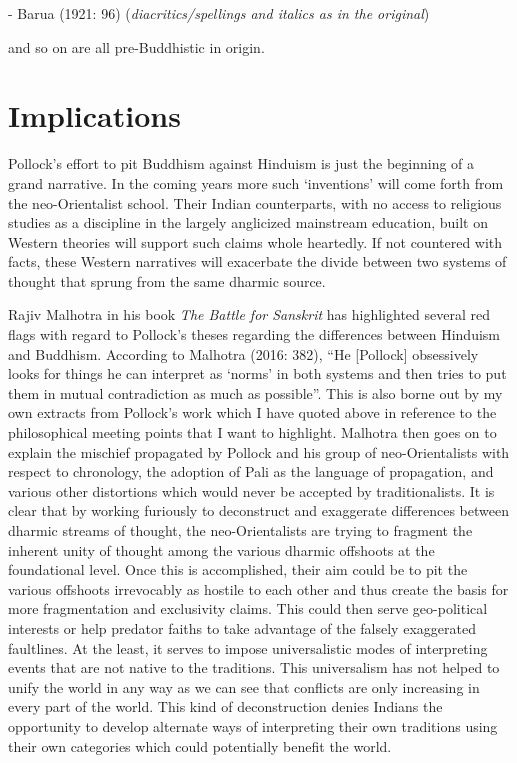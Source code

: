 {\vspace{-.3cm}

\begin{flushright}
- Barua (1921: 96) (\textit{diacritics/spellings and italics as in the original})
\end{flushright}} and so on are all pre-Buddhistic in origin.

\vspace{-.3cm}

\section*{Implications}

Pollock’s effort to pit Buddhism against Hinduism is just the beginning of a grand narrative. In the coming years more such ‘inventions’ will come forth from the neo-Orientalist school. Their Indian counterparts, with no access to religious studies as a discipline in the largely anglicized mainstream education, built on Western theories will support such claims whole heartedly. If not countered with facts, these Western narratives will exacerbate the divide between two systems of thought that sprung from the same dharmic source.

Rajiv Malhotra in his book \textit{The Battle for Sanskrit} has highlighted several red flags with regard to Pollock’s theses regarding the differences between Hinduism and Buddhism. According to Malhotra (2016: 382), “He [Pollock] obsessively looks for things he can interpret as ‘norms’ in both systems and then tries to put them in mutual contradiction as much as possible”. This is also borne out by my own extracts from Pollock’s work which I have quoted above in reference to the philosophical meeting points that I want to highlight. Malhotra then goes on to explain the mischief propagated by Pollock and his group of neo-Orientalists with respect to chronology, the adoption of Pali as the language of propagation, and various other distortions which would never be accepted by traditionalists. It is clear that by working furiously to deconstruct and exaggerate differences between dharmic streams of thought, the neo-Orientalists are trying to fragment the inherent unity of thought among the various dharmic offshoots at the foundational level. Once this is accomplished, their aim could be to pit the various offshoots irrevocably as hostile to each other and thus create the basis for more fragmentation and exclusivity claims. This could then serve geo-political interests or help predator faiths to take advantage of the falsely exaggerated faultlines. At the least, it serves to impose universalistic modes of interpreting events that are not native to the traditions. This universalism has not helped to unify the world in any way as we can see that conflicts are only increasing in every part of the world. This kind of deconstruction denies Indians the opportunity to develop alternate ways of interpreting their own traditions using their own categories which could potentially benefit the world.


